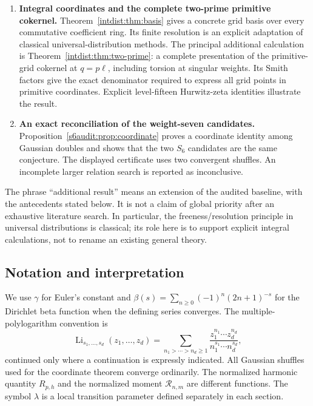 \documentclass[11pt,a4paper]{article}
\numberwithin{equation}{section}
\theoremstyle{plain}
\theoremstyle{definition}
\theoremstyle{remark}
\begin{document}
\begin{enumerate}[leftmargin=*,label=\arabic*.]
\item \textbf{Integral coordinates and the complete two-prime
primitive cokernel.} Theorem~\ref{intdist:thm:basis} gives a concrete
grid basis over every commutative coefficient ring. Its finite
resolution is an explicit adaptation of classical universal-distribution
methods. The principal additional calculation is
Theorem~\ref{intdist:thm:two-prime}: a complete presentation of the
primitive-grid cokernel at $q=p\ell$, including torsion at singular
weights. Its Smith factors give the exact denominator required to
express all grid points in primitive coordinates. Explicit level-fifteen
Hurwitz-zeta identities illustrate the result.

\item \textbf{An exact reconciliation of the weight-seven
candidates.} Proposition~\ref{s6audit:prop:coordinate} proves a
coordinate identity among Gaussian doubles and shows that the two
$S_6$ candidates are the same conjecture. The displayed certificate
uses two convergent shuffles. An incomplete larger relation search
is reported as inconclusive.
\end{enumerate}

The phrase ``additional result'' means an extension of the audited
baseline, with the antecedents stated below. It is not a claim of
global priority after an exhaustive literature search. In particular,
the freeness/resolution principle in universal distributions is
classical; its role here is to support explicit integral calculations,
not to rename an existing general theory.

\subsection{Notation and interpretation}

We use $\gamma$ for Euler's constant and
$\beta(s)=\sum_{n\ge0}(-1)^n(2n+1)^{-s}$ for the Dirichlet beta
function when the defining series converges. The multiple-polylogarithm
convention is
\[
 \operatorname{Li}_{s_1,\ldots,s_d}(z_1,\ldots,z_d)
 =\sum_{n_1>\cdots>n_d\ge1}
    \frac{z_1^{n_1}\cdots z_d^{n_d}}
         {n_1^{s_1}\cdots n_d^{s_d}},
\]
continued only where a continuation is expressly indicated. All
Gaussian shuffles used for the coordinate theorem converge ordinarily.
The normalized harmonic quantity $R_{p,h}$ and the normalized moment
$\mathcal R_{n,m}$ are different functions. The symbol $\lambda$ is a
local transition parameter defined separately in each section.
\end{document}
